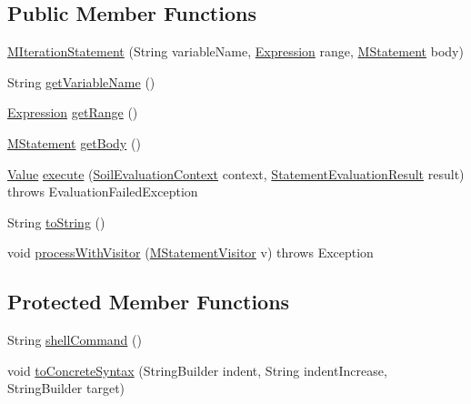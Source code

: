 \subsection*{Public Member Functions}
\begin{DoxyCompactItemize}
\item 
\hyperlink{classorg_1_1tzi_1_1use_1_1uml_1_1sys_1_1soil_1_1_m_iteration_statement_a714edc1fb19c5e3a6d40c0a7cb697ca7}{M\-Iteration\-Statement} (String variable\-Name, \hyperlink{classorg_1_1tzi_1_1use_1_1uml_1_1ocl_1_1expr_1_1_expression}{Expression} range, \hyperlink{classorg_1_1tzi_1_1use_1_1uml_1_1sys_1_1soil_1_1_m_statement}{M\-Statement} body)
\item 
String \hyperlink{classorg_1_1tzi_1_1use_1_1uml_1_1sys_1_1soil_1_1_m_iteration_statement_a5e657f0f81bf53575ec581629b0e8da8}{get\-Variable\-Name} ()
\item 
\hyperlink{classorg_1_1tzi_1_1use_1_1uml_1_1ocl_1_1expr_1_1_expression}{Expression} \hyperlink{classorg_1_1tzi_1_1use_1_1uml_1_1sys_1_1soil_1_1_m_iteration_statement_a231fd1f987951e3495762be48bcd18dd}{get\-Range} ()
\item 
\hyperlink{classorg_1_1tzi_1_1use_1_1uml_1_1sys_1_1soil_1_1_m_statement}{M\-Statement} \hyperlink{classorg_1_1tzi_1_1use_1_1uml_1_1sys_1_1soil_1_1_m_iteration_statement_a71077bbf9cc2a3c5fd0a2f9f33e3eb5f}{get\-Body} ()
\item 
\hyperlink{classorg_1_1tzi_1_1use_1_1uml_1_1ocl_1_1value_1_1_value}{Value} \hyperlink{classorg_1_1tzi_1_1use_1_1uml_1_1sys_1_1soil_1_1_m_iteration_statement_afeda355b011580ab756f0ebab469fc67}{execute} (\hyperlink{classorg_1_1tzi_1_1use_1_1uml_1_1sys_1_1soil_1_1_soil_evaluation_context}{Soil\-Evaluation\-Context} context, \hyperlink{classorg_1_1tzi_1_1use_1_1uml_1_1sys_1_1_statement_evaluation_result}{Statement\-Evaluation\-Result} result)  throws Evaluation\-Failed\-Exception 
\item 
String \hyperlink{classorg_1_1tzi_1_1use_1_1uml_1_1sys_1_1soil_1_1_m_iteration_statement_a39fd254cca8befdb1ccf70273e9df1a9}{to\-String} ()
\item 
void \hyperlink{classorg_1_1tzi_1_1use_1_1uml_1_1sys_1_1soil_1_1_m_iteration_statement_a49a70034c29cd66ca17153cbc6479a8b}{process\-With\-Visitor} (\hyperlink{interfaceorg_1_1tzi_1_1use_1_1uml_1_1sys_1_1soil_1_1_m_statement_visitor}{M\-Statement\-Visitor} v)  throws Exception 
\end{DoxyCompactItemize}
\subsection*{Protected Member Functions}
\begin{DoxyCompactItemize}
\item 
String \hyperlink{classorg_1_1tzi_1_1use_1_1uml_1_1sys_1_1soil_1_1_m_iteration_statement_ae02292a8f81231e507a7969f2782f93b}{shell\-Command} ()
\item 
void \hyperlink{classorg_1_1tzi_1_1use_1_1uml_1_1sys_1_1soil_1_1_m_iteration_statement_a1c0f2dd0fee67b38a952f4153bca3577}{to\-Concrete\-Syntax} (String\-Builder indent, String indent\-Increase, String\-Builder target)
\end{DoxyCompactItemize}


